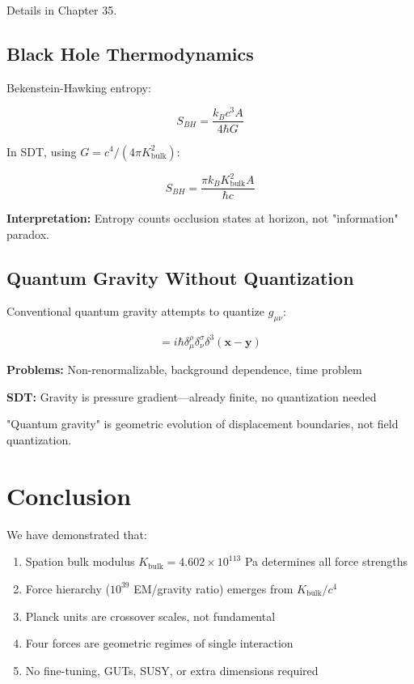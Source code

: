 Details in Chapter 35.

\subsection{Black Hole Thermodynamics}

Bekenstein-Hawking entropy:

\begin{equation}
S_{BH} = \frac{k_B c^3 A}{4\hbar G}
\end{equation}

In SDT, using $G = c^4/(4\pi K_{\text{bulk}}^2)$:

\begin{equation}
S_{BH} = \frac{\pi k_B K_{\text{bulk}}^2 A}{\hbar c}
\end{equation}

\textbf{Interpretation:} Entropy counts occlusion states at horizon, not "information" paradox.

\subsection{Quantum Gravity Without Quantization}

Conventional quantum gravity attempts to quantize $g_{\mu\nu}$:

\begin{equation}
[\hat{g}_{\mu\nu}(\mathbf{x}), \hat{\pi}^{\rho\sigma}(\mathbf{y})] = i\hbar \delta_{\mu}^{\rho} \delta_{\nu}^{\sigma} \delta^3(\mathbf{x} - \mathbf{y})
\end{equation}

\textbf{Problems:} Non-renormalizable, background dependence, time problem

\textbf{SDT:} Gravity is pressure gradient—already finite, no quantization needed

"Quantum gravity" is geometric evolution of displacement boundaries, not field quantization.

\section{Conclusion}

We have demonstrated that:

\begin{enumerate}
\item Spation bulk modulus $K_{\text{bulk}} = 4.602 \times 10^{113}$ Pa determines all force strengths
\item Force hierarchy ($10^{39}$ EM/gravity ratio) emerges from $K_{\text{bulk}}/c^4$
\item Planck units are crossover scales, not fundamental
\item Four forces are geometric regimes of single interaction
\item No fine-tuning, GUTs, SUSY, or extra dimensions required
\end{enumerate}

